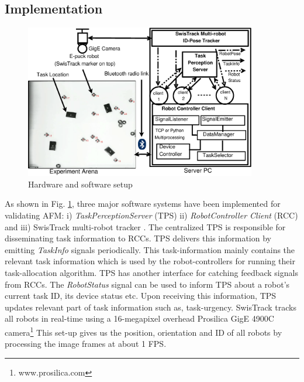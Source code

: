 \documentclass[smallcondensed]{svjour3}
\begin{document}
\subsection{Implementation}
\label{sec:impl}
\begin{figure}
\centering
\includegraphics[width=0.9\textwidth, angle=0]
{./images/RIL-Expt-Setup1.eps}
\caption{\small Hardware and software setup}
\label{fig:setup} %
\end{figure}
As shown in Fig. \ref{fig:setup}, three major software systems have been implemented for validating AFM: i) \textit{TaskPerceptionServer} (TPS) ii) \textit{RobotController Client} (RCC) and iii) SwisTrack multi-robot tracker \citep{Lochmatter+2008}. The centralized TPS is responsible for disseminating task information to RCCs. TPS delivers this information by emitting \textit{TaskInfo} signals periodically. This task-information mainly contains the relevant task information which is used by the robot-controllers for running their task-allocation algorithm. TPS has another interface for catching feedback signals from RCCs. The \textit{RobotStatus} signal can be used to inform TPS about a robot's current task ID, its device status etc. Upon  receiving this information, TPS updates relevant part of task information such as, task-urgency.  SwisTrack  tracks all robots in real-time using a 16-megapixel overhead Prosilica GigE 4900C camera\footnote{www.prosilica.com} This set-up gives us the position, orientation and ID of all  robots by processing the image frames at about 1 FPS.  
\end{document}

